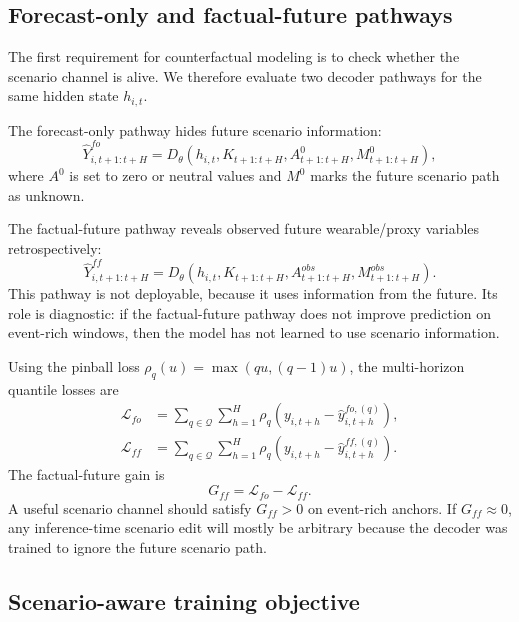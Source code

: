 \subsection{Forecast-only and factual-future pathways}
\label{subsec:fo_ff_pathways}

The first requirement for counterfactual modeling is to check whether the scenario channel is alive. We therefore evaluate two decoder pathways for the same hidden state $h_{i,t}$.

The forecast-only pathway hides future scenario information:
\begin{equation}
    \hat{Y}^{fo}_{i,t+1:t+H}
    = D_\theta(h_{i,t}, K_{t+1:t+H}, A^0_{t+1:t+H}, M^0_{t+1:t+H}),
    \label{eq:fo_decoder}
\end{equation}
where $A^0$ is set to zero or neutral values and $M^0$ marks the future scenario path as unknown.

The factual-future pathway reveals observed future wearable/proxy variables retrospectively:
\begin{equation}
    \hat{Y}^{ff}_{i,t+1:t+H}
    = D_\theta(h_{i,t}, K_{t+1:t+H}, A^{obs}_{t+1:t+H}, M^{obs}_{t+1:t+H}).
    \label{eq:ff_decoder}
\end{equation}
This pathway is not deployable, because it uses information from the future. Its role is diagnostic: if the factual-future pathway does not improve prediction on event-rich windows, then the model has not learned to use scenario information.

Using the pinball loss $\rho_q(u)=\max(q u,(q-1)u)$, the multi-horizon quantile losses are
\begin{align}
    \mathcal{L}_{fo}
    &= \sum_{q \in \mathcal{Q}} \sum_{h=1}^{H}
    \rho_q\left(y_{i,t+h} - \hat{y}^{fo,(q)}_{i,t+h}\right), \\
    \mathcal{L}_{ff}
    &= \sum_{q \in \mathcal{Q}} \sum_{h=1}^{H}
    \rho_q\left(y_{i,t+h} - \hat{y}^{ff,(q)}_{i,t+h}\right).
\end{align}
The factual-future gain is
\begin{equation}
    G_{ff} = \mathcal{L}_{fo} - \mathcal{L}_{ff}.
    \label{eq:factual_gain}
\end{equation}
A useful scenario channel should satisfy $G_{ff}>0$ on event-rich anchors. If $G_{ff}\approx 0$, any inference-time scenario edit will mostly be arbitrary because the decoder was trained to ignore the future scenario path.

\subsection{Scenario-aware training objective}
\label{subsec:cf_training_objective}

